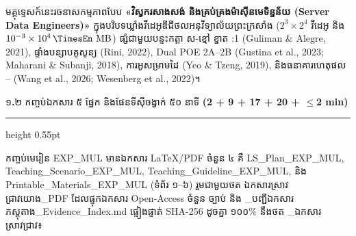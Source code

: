 \documentclass[a4paper,12pt]{article}
\newcommand{\en}[1]{{\TimesEn #1}}
\newcommand{\enbf}[1]{{\TimesEn\textbf{#1}}}
\newcommand{\unit}[1]{\,\text{\en{#1}}}
\newcommand{\cnum}[1]{{\TimesEn\fontsize{10.5pt}{12pt}\selectfont\ding{\numexpr181+#1\relax}}}
\newcommand{\subsectitle}[1]{{\muol\fontsize{11.5pt}{18.5pt}\selectfont #1}}
\newcommand{\subsec}[1]{%
  \Needspace{1.7cm}%
  \vspace{3pt}%
  \subsectitle{#1}\par%
  \vspace{-2pt}%
  {\color{black}\hrule height 0.55pt}%
  \vspace{3pt}%
}
\begin{document}
មគ្គុទ្ទេសក៍នេះរចនាសកម្មភាពបែប \textbf{«វិស្វករសាងសង់ និងគ្រប់គ្រងម៉ាស៊ីនមេទិន្នន័យ (\en{Server Data Engineers})»} ក្នុងបរិបទឃ្លាំងវីដេអូឌីជីថលអនុវិទ្យាល័យព្រះក្រសាំង ($2^3 \times 2^4$ វីដេអូ និង $10^{-3} \times 10^4\unit{MB}$) ផ្សំជាមួយបន្ទះកត្តា ស-ខ្មៅ ខ្នាត \en{1:1} \en{(Guliman \& Alegre, 2021)}, ផ្ទាំងបន្សាបគូសូន្យ \en{(Rini, 2022)}, \en{Dual POE 2A--2B} \en{(Gustina et al., 2023; Maharani \& Subanji, 2018)}, ការអូសម្រាមដៃ \en{[tracing]} \en{(Yeo \& Tzeng, 2019)}, និងធនាគារហេតុផល \cnum{1}--\cnum{5} \en{(Wang et al., 2026; Wesenberg et al., 2022)}។

\subsec{១\enbf{.}២ កញ្ចប់ឯកសារ ៥ ផ្នែក និងផែនទីស៊ីចង្វាក់ ៥០ នាទី \enbf{(2 + 9 + 17 + 20 + $\le$2 min)}}

កញ្ចប់មេរៀន \en{EXP\_MUL} មានឯកសារ \en{LaTeX/PDF} ចំនួន ៤ គឺ \en{LS\_\allowbreak Plan\_\allowbreak EXP\_\allowbreak MUL}, \en{Teaching\_\allowbreak Scenario\_\allowbreak EXP\_\allowbreak MUL}, \en{Teaching\_\allowbreak Guideline\_\allowbreak EXP\_\allowbreak MUL}, និង \en{Printable\_\allowbreak Materials\_\allowbreak EXP\_\allowbreak MUL} (ទំព័រ ១--៦) រួមជាមួយថត ឯកសារស្រាវជ្រាវយោង\en{\_\allowbreak PDF} ដែលផ្ទុកឯកសារ \en{Open-Access} ចំនួន \en{15} ច្បាប់ និង \en{00\_\allowbreak}បញ្ជីឯកសារភស្តុតាង\en{\_\allowbreak Evidence\_\allowbreak Index.md} ផ្ទៀងផ្ទាត់ \en{SHA-256} ដូចគ្នា ១០០\% នឹងថត \en{03\_\allowbreak}ឯកសារស្រាវជ្រាវ៖
\end{document}
